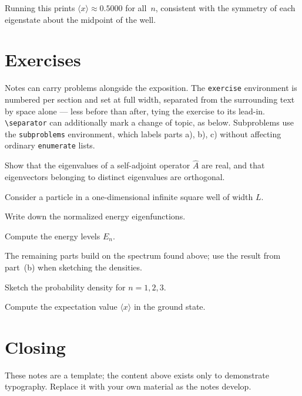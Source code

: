 \documentclass[a4paper,11pt]{article}
\begin{document}
Running this prints $\langle x \rangle \approx 0.5000$ for all~$n$, consistent with the symmetry of each eigenstate about the midpoint of the well.


\section{Exercises}

Notes can carry problems alongside the exposition. The
\verb|exercise| environment is numbered per section and set
at full width, separated from the surrounding text by space alone — less before than after, tying the exercise to its lead-in. \verb|\separator| can additionally mark a change of topic, as below. Subproblems use the \verb|subproblems| environment, which labels parts a), b), c) without affecting ordinary \verb|enumerate| lists.

\separator

\begin{exercise}
  Show that the eigenvalues of a self-adjoint operator $\hat{A}$ are real, and that eigenvectors belonging to distinct eigenvalues are orthogonal.
\end{exercise}

\begin{exercise}
  Consider a particle in a one-dimensional infinite square well of width $L$.
  \begin{subproblems}
    \item Write down the normalized energy eigenfunctions.
    \item Compute the energy levels $E_n$.
  \end{subproblems}

  The remaining parts build on the spectrum found above; use the result from part~(b) when sketching the densities.

  \begin{subproblems}[resume]
    \item Sketch the probability density for $n = 1, 2, 3$.
    \item Compute the expectation value $\langle x \rangle$ in the ground state.
  \end{subproblems}
\end{exercise}


\section{Closing}

These notes are a template; the content above exists only to demonstrate typography. Replace it with your own material as the notes develop.




\end{document}
